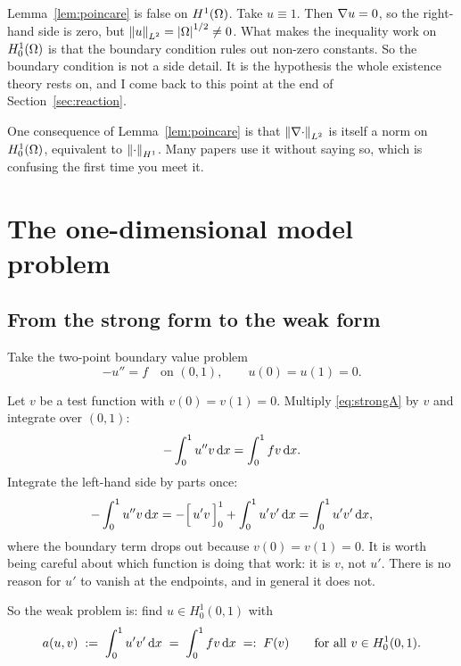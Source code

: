 \documentclass[11pt,a4paper]{article}
\begin{document}
\begin{remark}\label{rem:poincare-fails}
Lemma~\ref{lem:poincare} is false on $H^{1}(\Omega)$. Take $u \equiv 1$. Then
$\nabla u = 0$, so the right-hand side is zero, but
$\left\lVert u \right\rVert_{L^{2}} = \left\lvert \Omega \right\rvert^{1/2} \neq 0$. What makes the inequality work on
$H^{1}_{0}(\Omega)$ is that the boundary condition rules out non-zero constants. So the
boundary condition is not a side detail. It is the hypothesis the whole existence
theory rests on, and I come back to this point at the end of
Section~\ref{sec:reaction}.
\end{remark}

\begin{remark}
One consequence of Lemma~\ref{lem:poincare} is that $\left\lVert \nabla \cdot \right\rVert_{L^{2}}$ is
itself a norm on $H^{1}_{0}(\Omega)$, equivalent to $\left\lVert \cdot \right\rVert_{H^{1}}$. Many papers use it
without saying so, which is confusing the first time you meet it.
\end{remark}

\section{The one-dimensional model problem}

\subsection{From the strong form to the weak form}

Take the two-point boundary value problem
\begin{equation}\label{eq:strongA}
  -u'' = f \quad \text{on } (0,1), \qquad u(0) = u(1) = 0 .
\end{equation}

Let $v$ be a test function with $v(0)=v(1)=0$. Multiply \eqref{eq:strongA} by $v$
and integrate over $(0,1)$:
\[
  -\int_0^1 u'' v \,\mathrm{d}x = \int_0^1 f v \,\mathrm{d}x .
\]
Integrate the left-hand side by parts once:
\[
  -\int_0^1 u'' v \,\mathrm{d}x
  = -\Big[\, u' v \,\Big]_0^1 + \int_0^1 u' v' \,\mathrm{d}x
  = \int_0^1 u' v' \,\mathrm{d}x ,
\]
where the boundary term drops out because $v(0)=v(1)=0$. It is worth being
careful about which function is doing that work: it is $v$, not $u'$. There is no
reason for $u'$ to vanish at the endpoints, and in general it does not.

So the weak problem is: find $u \in H^1_0(0,1)$ with
\begin{equation}\label{eq:weakA}
  a(u,v) \;:=\; \int_0^1 u' v' \,\mathrm{d}x
  \;=\; \int_0^1 f v \,\mathrm{d}x \;=:\; F(v)
  \qquad \text{for all } v \in H^1_0(0,1).
\end{equation}
\end{document}
